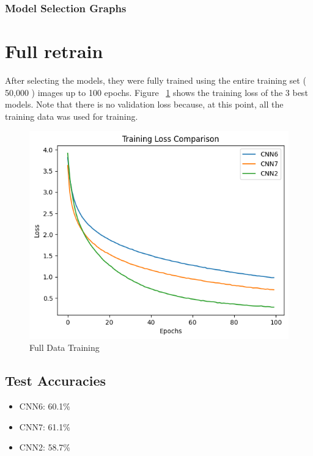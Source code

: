 \documentclass[conference]{IEEEtran}
\begin{document}
\subsubsection{Model Selection Graphs}

\section{Full retrain} \label{sec: full retrain}
After selecting the models, they were fully trained using the entire training set ( 50,000 ) images up to 100 epochs.
Figure ~\ref{fig: full data training} shows the training loss of the 3 best models. Note that there is no validation loss because, at this point, all the training data was used for training.
\begin{figure}[H]
    \centering
    \includegraphics[width=1\linewidth]{Full Data Training.png}
    \caption{Full Data Training}
    \label{fig: full data training}
\end{figure}

\subsection{Test Accuracies }
\begin{itemize}
    \item CNN6: 60.1\%
    \item CNN7: 61.1\%
    \item CNN2: 58.7\%
\end{itemize}
\end{document}
